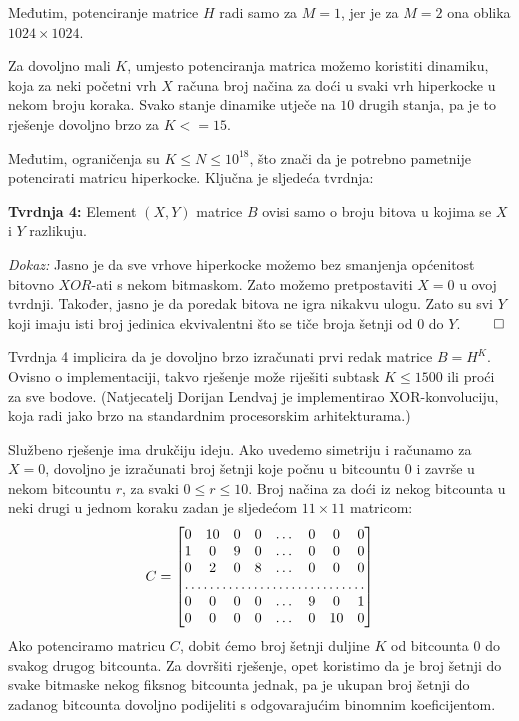 Međutim, potenciranje matrice $H$ radi samo za $M=1$, jer
je za $M=2$ ona oblika $1024 \times 1024$.

Za dovoljno mali $K$, umjesto potenciranja matrica možemo koristiti
dinamiku, koja za neki početni vrh $X$ računa broj načina 
za doći u svaki vrh hiperkocke u nekom broju koraka. Svako
stanje dinamike utječe na $10$ drugih stanja, pa je 
to rješenje dovoljno brzo za $K <= 15$.

Međutim, ograničenja su $K \le N \le 10^{18}$, što znači 
da je potrebno pametnije potencirati matricu hiperkocke.
Ključna je sljedeća tvrdnja:

\textbf{Tvrdnja 4:} Element $(X, Y)$ matrice $B$ ovisi samo o broju
bitova u kojima se $X$ i $Y$ razlikuju.

\textit{Dokaz:} Jasno je da sve vrhove hiperkocke možemo 
bez smanjenja općenitost bitovno $XOR$-ati s nekom bitmaskom.
Zato možemo pretpostaviti $X=0$ u ovoj tvrdnji.
Također, jasno je da poredak bitova ne igra nikakvu ulogu.
Zato su svi $Y$ koji imaju isti broj jedinica ekvivalentni 
što se tiče broja šetnji od $0$ do $Y$. $\qed$


Tvrdnja 4 implicira da je dovoljno brzo izračunati prvi redak matrice $B = H^K$. 
Ovisno o implementaciji, takvo rješenje može
riješiti subtask $K \le 1500$ ili proći za sve bodove.
(Natjecatelj Dorijan Lendvaj je implementirao XOR-konvoluciju,
koja radi jako brzo na standardnim procesorskim arhitekturama.)

Službeno rješenje ima drukčiju ideju.
Ako uvedemo simetriju i računamo za $X=0$, dovoljno je izračunati 
broj šetnji koje počnu u bitcountu $0$ i završe u nekom bitcountu $r$, za svaki
$0 \le r \le 10$. 
Broj načina za doći iz nekog bitcounta u neki drugi u jednom koraku
zadan je sljedećom $11 \times 11$ matricom:
\[
  C = 
\begin{bmatrix}
  0       & 10 & 0 & 0 & \dots  & 0 & 0 & 0 \\
    1       & 0 & 9 & 0 & \dots & 0 & 0 & 0 \\
    0       & 2 & 0 & 8 & \dots & 0 & 0 & 0 \\
    \hdotsfor{8} \\
    0       & 0 & 0 & 0 & \dots & 9 & 0 & 1 \\
    0       & 0 & 0 & 0 & \dots & 0 & 10 & 0 \\
\end{bmatrix}
\]
Ako potenciramo matricu $C$, dobit ćemo broj šetnji duljine $K$ od bitcounta $0$
do svakog drugog bitcounta.
Za dovršiti rješenje, opet koristimo da je broj šetnji do svake
bitmaske nekog fiksnog bitcounta jednak, pa je ukupan broj
šetnji do zadanog bitcounta dovoljno podijeliti s 
odgovarajućim binomnim koeficijentom.

